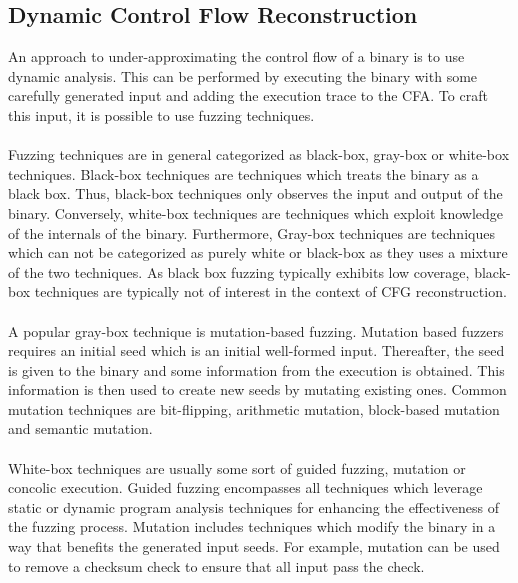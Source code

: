 \documentclass{kththesis}
\newcommand{\fbcomment}[1]{{#1}}
\renewcommand{\fbcomment}[1]{}
\begin{document}
\subsection{Dynamic Control Flow Reconstruction}
\fbcomment{\color{red}Goal: Describe different alternatives to directed symbolic execution and why directed symbolic execution was selected (For example, the example of "if(x=2)")}
An approach to under-approximating the control flow of a binary is to use dynamic analysis. This can be performed by executing the binary with some carefully generated input and adding the execution trace to the CFA. To craft this input, it is possible to use fuzzing techniques.
\\ \\
Fuzzing techniques are in general categorized as black-box, gray-box or white-box techniques\cite{fuzzingSurvey}. Black-box techniques are techniques which treats the binary as a black box. Thus, black-box techniques only observes the input and output of the binary. Conversely, white-box techniques are techniques which exploit knowledge of the internals of the binary. Furthermore, Gray-box techniques are techniques which can not be categorized as purely white or black-box as they uses a mixture of the two techniques. As black box fuzzing typically exhibits low coverage, black-box techniques are typically not of interest in the context of CFG reconstruction\cite{fuzzingSurvey}.
\\ \\
A popular gray-box technique is mutation-based fuzzing. Mutation based fuzzers requires an initial seed which is an initial well-formed input. Thereafter, the seed is given to the binary and some information from the execution is obtained. This information is then used to create new seeds by mutating existing ones. Common mutation techniques are bit-flipping, arithmetic mutation, block-based mutation and semantic mutation\cite{fuzzingSurvey}.
\\ \\ 
White-box techniques are usually some sort of guided fuzzing, mutation or concolic execution\cite{fuzzingSurvey}. Guided fuzzing encompasses all techniques which leverage static or dynamic program analysis techniques for enhancing the effectiveness of the fuzzing process. Mutation includes techniques which modify the binary in a way that benefits the generated input seeds. For example, mutation can be used to remove a checksum check to ensure that all input pass the check\cite{fuzzingSurvey}.
\\ \\
\end{document}
